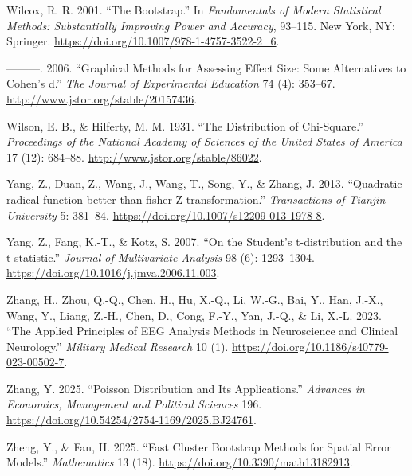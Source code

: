 \documentclass[
]{article}
\newlength{\cslhangindent}
\newlength{\cslentryspacingunit} %
\newenvironment{CSLReferences}[2] %
 {%
  \setlength{\parindent}{0pt}
  \ifodd #1
  \let\oldpar\par
  \def\par{\hangindent=\cslhangindent\oldpar}
  \fi
  \setlength{\parskip}{#2\cslentryspacingunit}
 }%
 {}
\begin{document}
\begin{CSLReferences}{1}{0}
\leavevmode{}%
Wilcox, R. R. 2001. {``The Bootstrap.''} In \emph{Fundamentals of Modern
Statistical Methods: Substantially Improving Power and Accuracy},
93--115. New York, NY: Springer.
\url{https://doi.org/10.1007/978-1-4757-3522-2_6}.

\leavevmode{}%
---------. 2006. {``Graphical Methods for Assessing Effect Size: Some
Alternatives to Cohen's d.''} \emph{The Journal of Experimental
Education} 74 (4): 353--67. \url{http://www.jstor.org/stable/20157436}.

\leavevmode{}%
Wilson, E. B., \& Hilferty, M. M. 1931. {``The Distribution of
Chi-Square.''} \emph{Proceedings of the National Academy of Sciences of
the United States of America} 17 (12): 684--88.
\url{http://www.jstor.org/stable/86022}.

\leavevmode{}%
Yang, Z., Duan, Z., Wang, J., Wang, T., Song, Y., \& Zhang, J. 2013.
{``{Quadratic radical function better than fisher Z transformation}.''}
\emph{Transactions of Tianjin University} 5: 381--84.
\url{https://doi.org/10.1007/s12209-013-1978-8}.

\leavevmode{}%
Yang, Z., Fang, K.-T., \& Kotz, S. 2007. {``{On the Student's
t-distribution and the t-statistic}.''} \emph{Journal of Multivariate
Analysis} 98 (6): 1293--1304.
\url{https://doi.org/10.1016/j.jmva.2006.11.003}.

\leavevmode{}%
Zhang, H., Zhou, Q.-Q., Chen, H., Hu, X.-Q., Li, W.-G., Bai, Y., Han,
J.-X., Wang, Y., Liang, Z.-H., Chen, D., Cong, F.-Y., Yan, J.-Q., \& Li,
X.-L. 2023. {``The Applied Principles of EEG Analysis Methods in
Neuroscience and Clinical Neurology.''} \emph{Military Medical Research}
10 (1). \url{https://doi.org/10.1186/s40779-023-00502-7}.

\leavevmode{}%
Zhang, Y. 2025. {``Poisson Distribution and Its Applications.''}
\emph{Advances in Economics, Management and Political Sciences} 196.
\url{https://doi.org/10.54254/2754-1169/2025.BJ24761}.

\leavevmode{}%
Zheng, Y., \& Fan, H. 2025. {``Fast Cluster Bootstrap Methods for
Spatial Error Models.''} \emph{Mathematics} 13 (18).
\url{https://doi.org/10.3390/math13182913}.


\end{CSLReferences}
\end{document}
